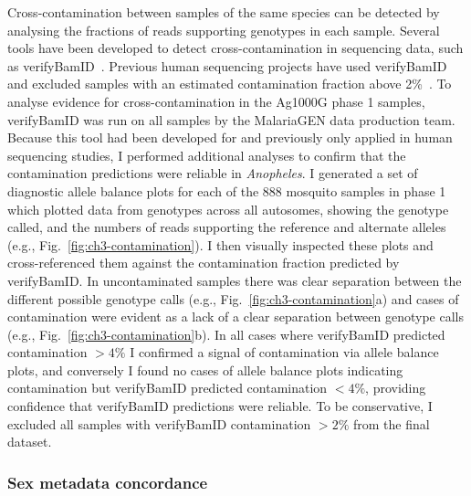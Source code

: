 \begin{refsection}
Cross-contamination between samples of the same species can be detected by analysing the fractions of reads supporting genotypes in each sample.
%
Several tools have been developed to detect cross-contamination in sequencing data, such as verifyBamID~\parencite{Jun2012}.
%
Previous human sequencing projects have used verifyBamID and excluded samples with an estimated contamination fraction above 2\%~\parencite{1000G2015}.
%
To analyse evidence for cross-contamination in the Ag1000G phase 1 samples, verifyBamID was run on all samples by the MalariaGEN data production team.
%
Because this tool had been developed for and previously only applied in human sequencing studies, I performed additional analyses to confirm that the contamination predictions were reliable in \textit{Anopheles}.
%
I generated a set of diagnostic allele balance plots for each of the 888 mosquito samples in phase 1 which plotted data from genotypes across all autosomes, showing the genotype called, and the numbers of reads supporting the reference and alternate alleles (e.g., Fig.~\ref{fig:ch3-contamination}).
%
I then visually inspected these plots and cross-referenced them against the contamination fraction predicted by verifyBamID.
%
In uncontaminated samples there was clear separation between the different possible genotype calls (e.g., Fig.~\ref{fig:ch3-contamination}a) and cases of contamination were evident as a lack of a clear separation between genotype calls (e.g., Fig.~\ref{fig:ch3-contamination}b).
%
In all cases where verifyBamID predicted contamination $>4\%$ I confirmed a signal of contamination via allele balance plots, and conversely I found no cases of allele balance plots indicating contamination but verifyBamID predicted contamination $<4\%$, providing confidence that verifyBamID predictions were reliable. 
%
To be conservative, I excluded all samples with verifyBamID contamination $>2\%$ from the final dataset.
%


\subsubsection{Sex metadata concordance}



\end{refsection}
